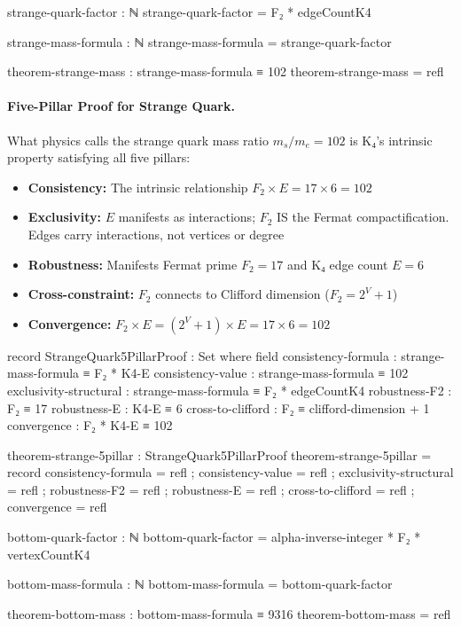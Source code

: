 \documentclass[11pt,a4paper]{book}
\begin{document}
\begin{code}
strange-quark-factor : ℕ
strange-quark-factor = F₂ * edgeCountK4

strange-mass-formula : ℕ
strange-mass-formula = strange-quark-factor

theorem-strange-mass : strange-mass-formula ≡ 102
theorem-strange-mass = refl
\end{code}

\paragraph{Five-Pillar Proof for Strange Quark.}
What physics calls the strange quark mass ratio $m_s/m_e = 102$ is K₄'s intrinsic property satisfying all five pillars:
\begin{itemize}
\item \textbf{Consistency:} The intrinsic relationship $F_2 \times E = 17 \times 6 = 102$
\item \textbf{Exclusivity:} $E$ manifests as interactions; $F_2$ IS the Fermat compactification. Edges carry interactions, not vertices or degree
\item \textbf{Robustness:} Manifests Fermat prime $F_2 = 17$ and K₄ edge count $E = 6$
\item \textbf{Cross-constraint:} $F_2$ connects to Clifford dimension ($F_2 = 2^V + 1$)
\item \textbf{Convergence:} $F_2 \times E = (2^V + 1) \times E = 17 \times 6 = 102$
\end{itemize}

\begin{code}
record StrangeQuark5PillarProof : Set where
  field
    consistency-formula : strange-mass-formula ≡ F₂ * K4-E
    consistency-value : strange-mass-formula ≡ 102
    exclusivity-structural : strange-mass-formula ≡ F₂ * edgeCountK4
    robustness-F2 : F₂ ≡ 17
    robustness-E : K4-E ≡ 6
    cross-to-clifford : F₂ ≡ clifford-dimension + 1
    convergence : F₂ * K4-E ≡ 102

theorem-strange-5pillar : StrangeQuark5PillarProof
theorem-strange-5pillar = record
  { consistency-formula = refl
  ; consistency-value = refl
  ; exclusivity-structural = refl
  ; robustness-F2 = refl
  ; robustness-E = refl
  ; cross-to-clifford = refl
  ; convergence = refl
  }
\end{code}

\begin{code}
bottom-quark-factor : ℕ
bottom-quark-factor = alpha-inverse-integer * F₂ * vertexCountK4

bottom-mass-formula : ℕ
bottom-mass-formula = bottom-quark-factor

theorem-bottom-mass : bottom-mass-formula ≡ 9316
theorem-bottom-mass = refl
\end{code}
\end{document}
